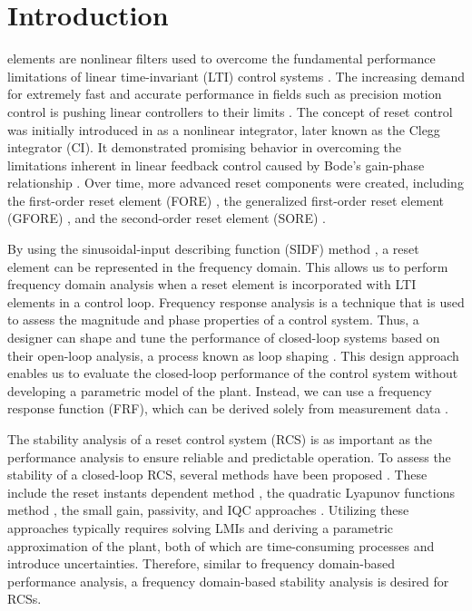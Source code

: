 \section{Introduction} \label{Introduction}
     elements are nonlinear filters used to overcome the fundamental performance limitations of linear time-invariant (LTI) control systems \cite{zhao2019overcoming}.
 The increasing demand for extremely fast and accurate performance in fields such as precision motion control is pushing linear controllers to their limits \cite{boyd1991linear}.
The concept of reset control was initially introduced in \cite{clegg1958nonlinear} as a nonlinear integrator, later known as the Clegg integrator (CI). It demonstrated promising behavior in overcoming the limitations inherent in linear feedback control caused by Bode’s gain-phase relationship \cite{CgLp}.
Over time, more advanced reset components were created, including the first-order reset element (FORE) \cite{horowitz1975non}, the generalized first-order reset element (GFORE) \cite{guo2009frequency}, and the second-order reset element (SORE) \cite{hazeleger2016second}.

By using the sinusoidal-input describing function (SIDF) method \cite{vander1968SIDF}, a reset element can be represented in the frequency domain. This allows us to perform frequency domain analysis when a reset element is incorporated with LTI elements in a control loop. Frequency response analysis is a technique that is used to assess the magnitude and phase properties of a control system. Thus, a designer can shape and tune the performance of closed-loop systems based on their open-loop analysis, a process known as loop shaping \cite{van2017frequency}. This design approach enables us to evaluate the closed-loop performance of the control system without developing a parametric model of the plant. Instead, we can use a frequency response function (FRF), which can be derived solely from measurement data \cite{franklin2002feedback}.

The stability analysis of a reset control system (RCS) is as important as the performance analysis to ensure reliable and predictable operation. To assess the stability of a closed-loop RCS, several methods have been proposed \cite{banos2010reset,paesa2011design,banos2012reset,guo2015analysis,vettori2014geometric,griggs2009interconnections,hollot1997stability}. These include the reset instants dependent method \cite{banos2010reset,paesa2011design}, the quadratic Lyapunov functions method \cite{banos2012reset,guo2015analysis,vettori2014geometric}, the small gain, passivity, and IQC approaches \cite{griggs2009interconnections,hollot1997stability}. Utilizing these approaches typically requires solving LMIs and deriving a parametric approximation of the plant, both of which are time-consuming processes and introduce uncertainties. Therefore, similar to frequency domain-based performance analysis, a frequency domain-based stability analysis is desired for RCSs.

